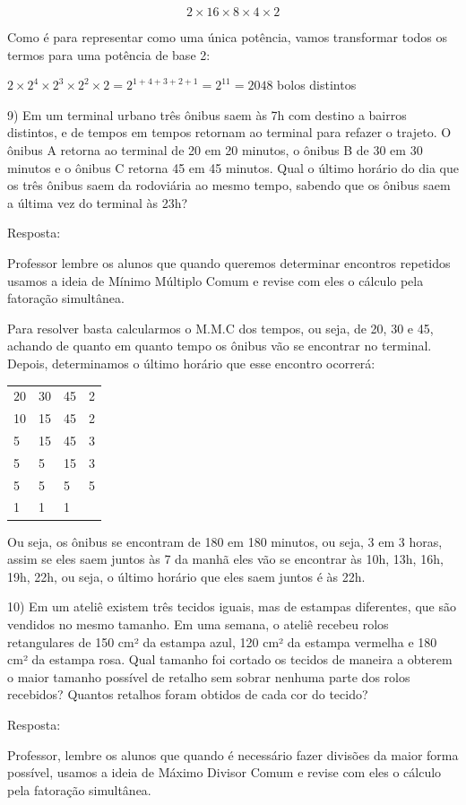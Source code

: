 \[2 \times 16 \times 8 \times 4 \times 2\]

Como é para representar como uma única potência, vamos transformar todos
os termos para uma potência de base 2:

\(2 \times 2^{4} \times 2^{3} \times 2^{2} \times 2 = 2^{1 + 4 + 3 + 2 + 1} = 2^{11} = 2048\)
bolos distintos

9) Em um terminal urbano três ônibus saem às 7h com destino a bairros
distintos, e de tempos em tempos retornam ao terminal para refazer o
trajeto. O ônibus A retorna ao terminal de 20 em 20 minutos, o ônibus B
de 30 em 30 minutos e o ônibus C retorna 45 em 45 minutos. Qual o último
horário do dia que os três ônibus saem da rodoviária ao mesmo tempo,
sabendo que os ônibus saem a última vez do terminal às 23h?

Resposta:

Professor lembre os alunos que quando queremos determinar encontros
repetidos usamos a ideia de Mínimo Múltiplo Comum e revise com eles o
cálculo pela fatoração simultânea.

Para resolver basta calcularmos o M.M.C dos tempos, ou seja, de 20, 30 e
45, achando de quanto em quanto tempo os ônibus vão se encontrar no
terminal. Depois, determinamos o último horário que esse encontro
ocorrerá:

\begin{longtable}[]{@{}llll@{}}
\toprule
\endhead
\(20\) & 30 & 45 & 2\tabularnewline
10 & 15 & 45 & 2\tabularnewline
5 & 15 & 45 & 3\tabularnewline
5 & 5 & 15 & 3\tabularnewline
5 & 5 & 5 & 5\tabularnewline
1 & 1 & 1 &\tabularnewline
\bottomrule
\end{longtable}

Ou seja, os ônibus se encontram de 180 em 180 minutos, ou seja, 3 em 3
horas, assim se eles saem juntos às 7 da manhã eles vão se encontrar às
10h, 13h, 16h, 19h, 22h, ou seja, o último horário que eles saem juntos
é às 22h.

10) Em um ateliê existem três tecidos iguais, mas de estampas
diferentes, que são vendidos no mesmo tamanho. Em uma semana, o ateliê
recebeu rolos retangulares de 150 cm² da estampa azul, 120 cm² da
estampa vermelha e 180 cm² da estampa rosa. Qual tamanho foi cortado os
tecidos de maneira a obterem o maior tamanho possível de retalho sem
sobrar nenhuma parte dos rolos recebidos? Quantos retalhos foram obtidos
de cada cor do tecido?

Resposta:

Professor, lembre os alunos que quando é necessário fazer divisões da
maior forma possível, usamos a ideia de Máximo Divisor Comum e revise
com eles o cálculo pela fatoração simultânea.

